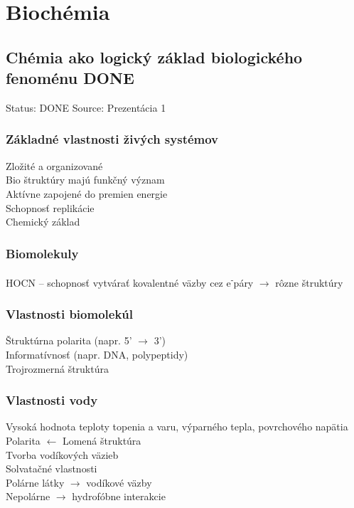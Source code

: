 \newcommand\tab[1][1cm]{\hspace*{#1}}
\newcommand{\el}{e\textsuperscript{-}}
\newcommand{\ra}{$\rightarrow$}
\newcommand{\la}{$\leftarrow$}
\chapter[Biochémia]{Biochémia}
\label{biochemia} %

\section{Chémia ako logický základ biologického fenoménu DONE}
Status: DONE
Source: Prezentácia 1
\\
\subsection{Základné vlastnosti živých systémov}
Zložité a organizované\\
Bio štruktúry majú funkčný význam\\
Aktívne zapojené do premien energie\\
Schopnosť replikácie\\
Chemický základ
\subsection{Biomolekuly}
HOCN -- schopnosť vytvárať kovalentné väzby cez \el páry $\rightarrow$ rôzne štruktúry
\subsection{Vlastnosti biomolekúl}
Štruktúrna polarita (napr. 5' $\rightarrow$ 3')\\
Informatívnosť (napr. DNA, polypeptidy)\\
Trojrozmerná štruktúra\\
\subsection{Vlastnosti vody}
Vysoká hodnota teploty topenia a varu, výparného tepla, povrchového napätia\\
Polarita $\leftarrow$ Lomená štruktúra\\
Tvorba vodíkových väzieb\\
Solvatačné vlastnosti\\
\tab Polárne látky $\rightarrow$ vodíkové väzby\\
\tab Nepolárne $\rightarrow$ hydrofóbne interakcie
